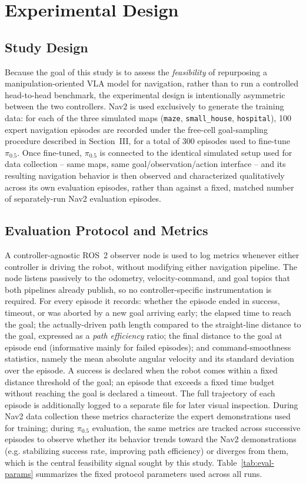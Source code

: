 \documentclass[conference]{IEEEtran}
\begin{document}
\section{Experimental Design}

\subsection{Study Design}
Because the goal of this study is to assess the \emph{feasibility} of repurposing a manipulation-oriented VLA model for navigation, rather than to run a controlled head-to-head benchmark, the experimental design is intentionally asymmetric between the two controllers. Nav2 is used exclusively to generate the training data: for each of the three simulated maps (\texttt{maze}, \texttt{small\_house}, \texttt{hospital}), 100 expert navigation episodes are recorded under the free-cell goal-sampling procedure described in Section~III, for a total of 300 episodes used to fine-tune $\pi_{0.5}$. Once fine-tuned, $\pi_{0.5}$ is connected to the identical simulated setup used for data collection -- same maps, same goal/observation/action interface -- and its resulting navigation behavior is then observed and characterized qualitatively across its own evaluation episodes, rather than against a fixed, matched number of separately-run Nav2 evaluation episodes.

\subsection{Evaluation Protocol and Metrics}
A controller-agnostic ROS~2 observer node is used to log metrics whenever either controller is driving the robot, without modifying either navigation pipeline. The node listens passively to the odometry, velocity-command, and goal topics that both pipelines already publish, so no controller-specific instrumentation is required. For every episode it records: whether the episode ended in success, timeout, or was aborted by a new goal arriving early; the elapsed time to reach the goal; the actually-driven path length compared to the straight-line distance to the goal, expressed as a \emph{path efficiency} ratio; the final distance to the goal at episode end (informative mainly for failed episodes); and command-smoothness statistics, namely the mean absolute angular velocity and its standard deviation over the episode. A success is declared when the robot comes within a fixed distance threshold of the goal; an episode that exceeds a fixed time budget without reaching the goal is declared a timeout. The full trajectory of each episode is additionally logged to a separate file for later visual inspection. During Nav2 data collection these metrics characterize the expert demonstrations used for training; during $\pi_{0.5}$ evaluation, the same metrics are tracked across successive episodes to observe whether its behavior trends toward the Nav2 demonstrations (e.g. stabilizing success rate, improving path efficiency) or diverges from them, which is the central feasibility signal sought by this study. Table~\ref{tab:eval-params} summarizes the fixed protocol parameters used across all runs.
\end{document}
